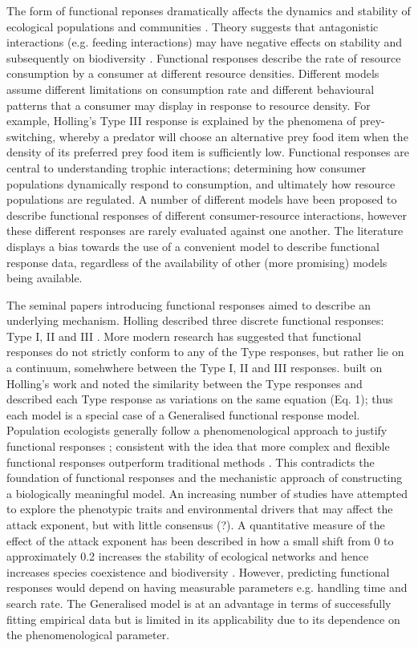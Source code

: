 \documentclass[11pt]{article}
\begin{document}
        The form of functional reponses dramatically affects the dynamics and stability of ecological populations and communities \citep{hastings2013population}. Theory suggests that antagonistic interactions (e.g. feeding interactions) may have negative effects on stability and subsequently on biodiversity \citep{rosenbaum2018fitting}. Functional responses describe the rate of resource consumption by a consumer at different resource densities. Different models assume different limitations on consumption rate and different behavioural patterns that a consumer may display in response to resource density. For example, Holling's Type III response is explained by the phenomena of prey-switching, whereby a predator will choose an alternative prey food item when the density of its preferred prey food item is sufficiently low. Functional responses are central to understanding trophic interactions; determining how consumer populations dynamically respond to consumption, and ultimately how resource populations are regulated. A number of different models have been proposed to describe functional responses of different consumer-resource interactions, however these different responses are rarely evaluated against one another. The literature displays a bias towards the use of a convenient model to describe functional response data, regardless of the availability of other (more promising) models being available.
            
        The seminal papers introducing functional responses aimed to describe an underlying mechanism. Holling described three discrete functional responses: Type I, II \citep{holling1959some} and III \citep{holling1959some}. More modern research has suggested that functional responses do not strictly conform to any of the Type responses, but rather lie on a continuum, somehwhere between the Type I, II and III responses. \citet{real1977kinetics} built on Holling's work and noted the similarity between the Type responses and described each Type response as variations on the same equation (Eq. 1); thus each model is a special case of a Generalised functional response model. Population ecologists generally follow a phenomenological approach to justify functional responses \citep{jeschke2002predator}; consistent with the idea that more complex and flexible functional responses outperform traditional methods \citep{rosenbaum2018fitting}. This contradicts the foundation of functional responses and the mechanistic approach of constructing a biologically meaningful model. An increasing number of studies have attempted to explore the phenotypic traits and environmental drivers that may affect the attack exponent, but with little consensus (?). A quantitative measure of the effect of the attack exponent has been described in how a small shift from 0 to approximately 0.2 increases the stability of ecological networks \citep{williams2004stabilization} and hence increases species coexistence and biodiversity \citep{c2008food}. However, predicting functional responses would depend on having measurable parameters e.g. handling time and search rate. The Generalised model is at an advantage in terms of successfully fitting empirical data but is limited in its applicability due to its dependence on the phenomenological parameter.
            
\end{document}
